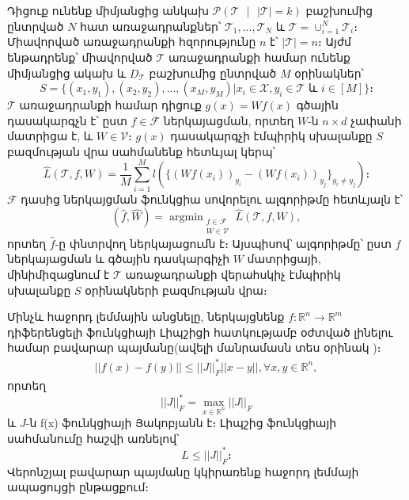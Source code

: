 \documentclass[12pt]{article}
\DeclareMathOperator*{\argmin}{argmin}
\begin{document}
Դիցուք ունենք միմյանցից անկախ $\mathcal{P}(\mathcal{T} \text{ } |\text{ }  |\mathcal{T}| = k)$ բաշխումից ընտրված $N$ հատ առաջադրանքներ՝ $\mathcal{T}_1, ..., \mathcal{T}_N$  և $\mathcal{T} = \cup_{i=1}^N{\mathcal{T}_i}$։ Միավորված առաջադրանքի հզորությունը $n$ է՝  $|\mathcal{T}| =n $։ Այժմ ենթադրենք՝ միավորված $\mathcal{T}$ առաջադրանքի համար ունենք միմյանցից ակախ և $D_{\mathcal{T}}$ բաշխումից ընտրված $M$ օրինակներ՝
$$S = \{(x_1, y_1), (x_2, y_2), ..., (x_M, y_M) | x_i \in \mathcal{X}, y_i \in \mathcal{T} \text{ և } i \in [M] \}։$$
$\mathcal{T}$   առաջադրանքի համար դիցուք $g(x) = Wf(x)$ գծային դասակարգչն է՝ ըստ $f \in \mathcal{F}$ ներկայացման, որտեղ $W$-ն $n \times d$ չափանի մատրիցա է, և $W \in \mathcal{V}$։ $g(x)$ դասակարգչի էմպիրիկ սխալանքը $S$ բազմության վրա սահմանենք հետևյալ կերպ՝
$$\hat{L}(\mathcal{T},f, W) = \frac{1}{M}\sum_{i=1}^Ml(\{(Wf(x_i))_{y_i} - (Wf(x_i))_{y_j}\}_{y_i \neq y_j})։$$ 
$\mathcal{F}$ դասից  ներկայցման ֆունկցիա սովորելու ալգորիթմը հետևյալն է՝
$$(\hat{f}, \hat{W}) = \argmin_{\substack{f \in \mathcal{F} \\ W \in \mathcal{V}}} \hat{L}(\mathcal{T},f, W),$$
որտեղ $\hat{f}$-ը փնտրվող ներկայացումն է։ Այսպիսով՝ ալգորիթմը՝ ըստ $f$ ներկայացման և գծային դասկարգիչի $W$ մատրիցայի,  մինիմիզացնում է $\mathcal{T}$ առաջադրանքի վերահսկիչ էմպիրիկ սխալանքը $S$ օրինակների բազմության վրա։

Մինչև հաջորդ լեմմային անցնելը, ներկայցնենք $f:\mathbb{R}^n \rightarrow \mathbb{R}^m$ դիֆերենցելի ֆունկցիայի Լիպշիցի հատկությամբ օժտված լինելու համար բավարար պայմանը(ավելի մանրամասն տես օրինակ \cite[էջ 60-61]{bib_item_13})։ 
\begin{align*}
||f(x) - f(y)|| \leq ||J||_F^* ||x-y||, \forall x, y \in \mathbb{R}^n,
\end{align*}
որտեղ $$||J||^*_F =  \max_{x \in \mathbb{R}^n}||J||_F$$
և $J$-ն f(x) ֆունկցիայի Յակոբյանն է։  Լիպշից ֆունկցիայի սահմանումը հաշվի առնելով՝ $$L \leq ||J||_F^*։$$
Վերոնշյալ բավարար պայմանը կկիրառենք հաջորդ լեմմայի ապացույցի ընթացքում։
\end{document}

